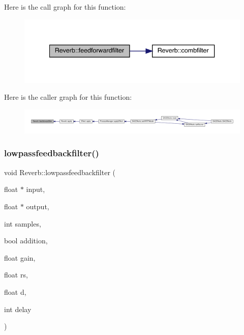 Here is the call graph for this function\+:
\nopagebreak
\begin{figure}[H]
\begin{center}
\leavevmode
\includegraphics[width=340pt]{class_reverb_aabbbdbef25b5d4518e5611c608c37b0a_cgraph}
\end{center}
\end{figure}
Here is the caller graph for this function\+:
\nopagebreak
\begin{figure}[H]
\begin{center}
\leavevmode
\includegraphics[width=350pt]{class_reverb_aabbbdbef25b5d4518e5611c608c37b0a_icgraph}
\end{center}
\end{figure}
\mbox{\label{class_reverb_a43184fe4ef185da6d7d6049c3866c294}} 
\subsubsection{\texorpdfstring{lowpassfeedbackfilter()}{lowpassfeedbackfilter()}}
{\footnotesize\ttfamily void Reverb\+::lowpassfeedbackfilter (\begin{DoxyParamCaption}\item[{float $\ast$}]{input,  }\item[{float $\ast$}]{output,  }\item[{int}]{samples,  }\item[{bool}]{addition,  }\item[{float}]{gain,  }\item[{float}]{rs,  }\item[{float}]{d,  }\item[{int}]{delay }\end{DoxyParamCaption})}


